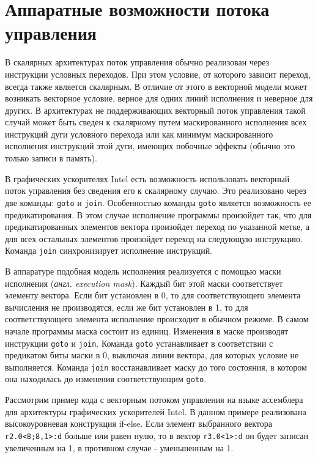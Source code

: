 \section{Аппаратные возможности потока управления}
\label{sec:Goto}

В скалярных архитектурах поток управления обычно реализован через инструкции
условных переходов. При этом условие, от которого зависит переход, всегда также
является скалярным. В отличие от этого в векторной модели может возникать
векторное условие, верное для одних линий исполнения и неверное для других.
В архитектурах не поддерживающих векторный поток управления такой случай может
быть сведен к скалярному путем маскированного исполнения всех инструкций дуги
условного перехода или как минимум маскированного исполнения инструкций этой
дуги, имеющих побочные эффекты (обычно это только записи в память).

В графических ускорителях Intel есть возможность использовать векторный поток
управления без сведения его к скалярному случаю. Это реализовано через две
команды: \texttt{goto} и \texttt{join}. Особенностью команды \texttt{goto}
является возможность ее предикатирования. В этом случае исполнение программы
произойдет так, что для предикатированных элементов вектора произойдет переход
по указанной метке, а для всех остальных элементов произойдет переход на
следующую инструкцию. Команда \texttt{join} синхронизирует исполнение
инструкций.

В аппаратуре подобная модель исполнения реализуется с помощью маски исполнения
(\textit{англ. execution mask}). Каждый бит этой маски соответствует элементу
вектора. Если бит установлен в 0, то для соответствующего элемента вычисления не
производятся, если же бит установлен в 1, то для соответствующего элемента
исполнение происходит в обычном режиме. В самом начале программы маска состоит
из единиц. Изменения в маске производят инструкции \texttt{goto} и \texttt{join}.
Команда \texttt{goto} устанавливает в соответствии с предикатом биты маски в 0,
выключая линии вектора, для которых условие не выполняется. Команда \texttt{join}
восстанавливает маску до того состояния, в котором она находилась до изменения
соответствующим \texttt{goto}.

Рассмотрим пример кода с векторным потоком управления на языке ассемблера для
архитектуры графических ускорителей Intel. В данном примере реализована
высокоуровневая конструкция if-else. Если элемент выбранного вектора
\texttt{r2.0<8;8,1>:d} больше или равен нулю, то в вектор \texttt{r3.0<1>:d} он
будет записан увеличенным на 1, в противном случае - уменьшенным на 1.

